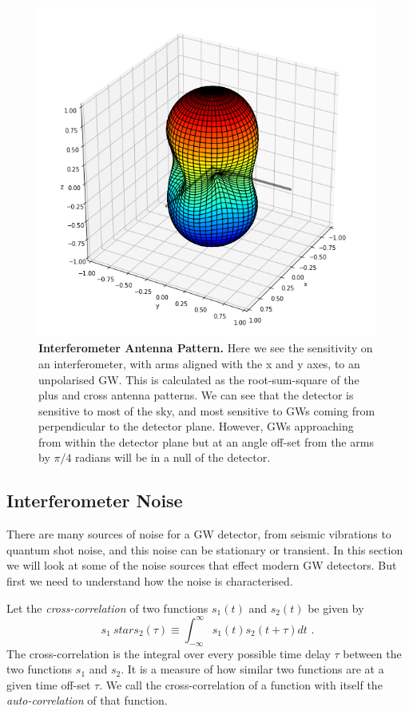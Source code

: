 \documentclass[11pt]{cuthesis}
\newcommand{\fs}{\text{ .}}
\newcommand{\infint}{\int^\infty_{-\infty} }
\begin{document}
\begin{figure} %
\begin{center}
\includegraphics[width=0.8\linewidth]{antenna_pattern.png}
\end{center}
\caption{\textbf{Interferometer Antenna Pattern.} Here we see the sensitivity on an interferometer, with arms aligned with the x and y axes, to an unpolarised GW. This is calculated as the root-sum-square of the plus and cross antenna patterns. We can see that the detector is sensitive to most of the sky, and most sensitive to GWs coming from perpendicular to the detector plane. However, GWs approaching from within the detector plane but at an angle off-set from the arms by $\pi/4$ radians will be in a null of the detector.}
\label{fig:antenna pattern}
\end{figure}

\subsection{Interferometer Noise}
There are many sources of noise for a GW detector, from seismic vibrations to quantum shot noise, and this noise can be stationary or transient. In this section we will look at some of the noise sources that effect modern GW detectors. But first we need to understand how the noise is characterised. 

Let the \textit{cross-correlation} of two functions $s_1(t)$ and $s_2(t)$ be given by
\begin{equation}
s_1 \ star s_2 (\tau) \equiv \infint s_1(t) s_2 (t+\tau)dt \fs
\end{equation}
The cross-correlation is the integral over every possible time delay $\tau$ between the two functions $s_1$ and $s_2$. It is a measure of how similar two functions are at a given time off-set $\tau$. We call the cross-correlation of a function with itself the \textit{auto-correlation} of that function.
\end{document}
